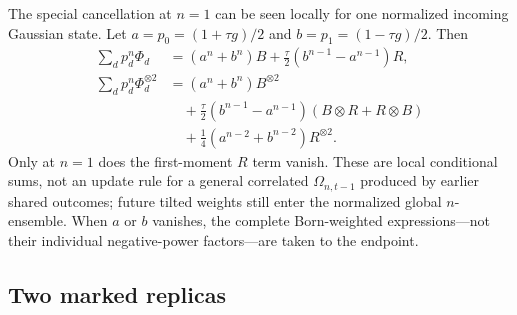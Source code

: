 \documentclass[
  aps,prx,twocolumn,superscriptaddress,longbibliography,
  nofootinbib,floatfix
]{revtex4-2}
\theoremstyle{plain}
\theoremstyle{definition}
\begin{document}
The special cancellation at \(n=1\) can be seen locally for one normalized
incoming Gaussian state.  Let
\(a=p_0=(1+\tau g)/2\) and \(b=p_1=(1-\tau g)/2\).  Then
\begin{align}
 \sum_dp_d^n\Phi_d
 &=(a^n+b^n)B
 +\frac{\tau}{2}(b^{n-1}-a^{n-1})R,
 \label{eq:n-local-first}\\
 \sum_dp_d^n\Phi_d^{\otimes2}
 &=(a^n+b^n)B^{\otimes2}
 \nonumber\\
 &\quad
 +\frac{\tau}{2}(b^{n-1}-a^{n-1})
 (B\otimes R+R\otimes B)
 \nonumber\\
 &\quad+\frac14(a^{n-2}+b^{n-2})R^{\otimes2}.
 \label{eq:n-local-second}
\end{align}
Only at \(n=1\) does the first-moment \(R\) term vanish.  These are local
conditional sums, not an update rule for a general correlated
\(\Omega_{n,t-1}\) produced by earlier shared outcomes; future tilted weights
still enter the normalized global \(n\)-ensemble.  When \(a\) or \(b\)
vanishes, the complete Born-weighted expressions---not their individual
negative-power factors---are taken to the endpoint.

\subsection{Two marked replicas}
\end{document}
